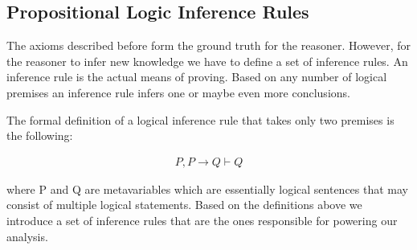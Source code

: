 \subsection{Propositional Logic Inference Rules}

The axioms described before form the ground truth for the reasoner. However, for the
reasoner to infer new knowledge we have to define a set of inference rules. An inference
rule is the actual means of proving. Based on any number of logical premises an inference
rule infers one or maybe even more conclusions.

The formal definition of a logical inference rule that takes only two premises is the following:

\begin{equation}
  \label{eq:inference-rule}
  \begin{aligned}
    P, P \rightarrow Q \vdash Q
  \end{aligned}
\end{equation}

where P and Q are metavariables which are essentially logical sentences that may consist
of multiple logical statements. Based on the definitions above we introduce a set of inference
rules that are the ones responsible for powering our analysis.

